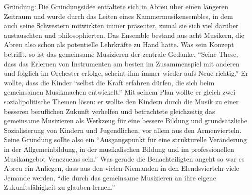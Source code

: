 Gründung: Die Gründungsidee entfaltete sich in Abreu über einen längeren
Zeitraum und wurde durch das Leiten eines Kammermusikensembles, in dem auch
seine Schwestern mitwirkten immer präsenter, zumal sie sich viel darüber
austauschten und philosophierten. Das Ensemble bestand aus acht Musikern, die
Abreu also schon als potentielle Lehrkräfte zu Hand hatte.
\autocite[34]{kaufmann:el_sistema} Was sein Konzept betrifft, so ist das
gemeinsame Musizieren der zentrale Gedanke. \enquote{Seine These, dass das
Erlernen von Instrumenten am besten im Zusammenspiel mit anderen und folglich im
Orchester erfolge, scheint ihm immer wieder aufs Neue
richtig.}\autocite[34]{kaufmann:el_sistema} Er wollte, dass die Kinder
\enquote{selbst die Kraft erfahren dürfen, die sich beim gemeinsamen Musikmachen
entwickelt.}\autocite[34]{kaufmann:el_sistema} Mit seinem Plan wollte er gleich
zwei sozialipolitische Themen lösen: er wollte den Kindern durch die Musik zu
einer besseren beruflichen Zukunft verhelfen und betrachtete gleichzeitig das
gemeinsame Musizieren als Werkzeug für eine bessere Bildung und grundsätzliche
Sozialisierung von Kindern und Jugendlichen, vor allem aus den Armenvierteln.
Seine Gründung sollte also ein \enquote{Ausgangspunkt für eine strukturelle
Veränderung in der Allgemeinbildung, in der musikalischen Bildung und im
professionellen Musikangebot Venezuelas
sein.}\autocite[38]{kaufmann:el_sistema} Was gerade die Benachteiligten angeht
so war es Abreu ein Anliegen, dass aus den vielen Niemanden in den
Elendsvierteln viele Jemande werden, \enquote{die durch das gemeinsame
Musizieren an ihre eigene Zukunftsfähigkeit zu glauben
lernen.}\autocite[39]{kaufmann:el_sistema}

